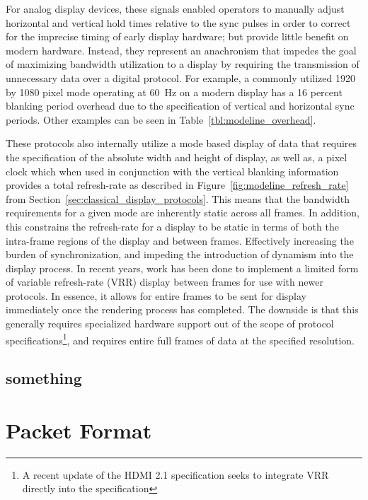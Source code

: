         For analog display devices, these signals enabled operators to manually adjust horizontal and vertical hold times relative to the sync pulses in order to correct for the imprecise timing of early display hardware; but provide little benefit on modern hardware. Instead, they represent an anachronism that impedes the goal of maximizing bandwidth utilization to a display by requiring the transmission of unnecessary data over a digital protocol. For example, a commonly utilized 1920 by 1080 pixel mode operating at \mbox{60 Hz}\cite{MythTVWebsite} on a modern display has a 16 percent blanking period overhead due to the specification of vertical and horizontal sync periods. Other examples can be seen in Table~\ref{tbl:modeline_overhead}.

        These protocols also internally utilize a mode based display of data that requires the specification of the absolute width and height of display, as well as, a pixel clock which when used in conjunction with the vertical blanking information provides a total refresh-rate as described in Figure~\ref{fig:modeline_refresh_rate} from Section~\ref{sec:classical_display_protocols}. This means that the bandwidth requirements for a given mode are inherently static across all frames. In addition, this constrains the refresh-rate for a display to be static in terms of both the intra-frame regions of the display and between frames. Effectively increasing the burden of synchronization, and impeding the introduction of dynamism into the display process. In recent years, work has been done to implement a limited form of variable refresh-rate (VRR) display between frames for use with newer protocols\cite{AMDFreesync,NVIDIAGsync}. In essence, it allows for entire frames to be sent for display immediately once the rendering process has completed. The downside is that this generally requires specialized hardware support out of the scope of protocol specifications\footnote{A recent update of the HDMI 2.1 specification\cite{HDMIForum2018} seeks to integrate VRR directly into the specification}, and requires entire full frames of data at the specified resolution.

    \subsection{something}


\section{Packet Format}


